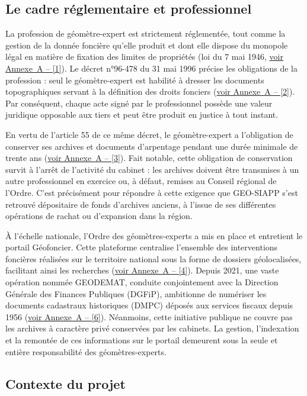 \subsection{Le cadre réglementaire et professionnel}

La profession de géomètre-expert est strictement réglementée, tout comme la gestion de la donnée foncière qu'elle produit et dont elle dispose du monopole légal en matière de fixation des limites de propriétés (loi du 7 mai 1946, \hyperref[ann:textes_loi]{voir Annexe~A -- [1]}). Le décret n°96-478 du 31 mai 1996 précise les obligations de la profession : seul le géomètre-expert est habilité à dresser les documents topographiques servant à la définition des droits fonciers (\hyperref[ann:textes_loi]{voir Annexe~A -- [2]}). Par conséquent, chaque acte signé par le professionnel possède une valeur juridique opposable aux tiers et peut être produit en justice à tout instant.

En vertu de l'article 55 de ce même décret, le géomètre-expert a l'obligation de conserver ses archives et documents d'arpentage pendant une durée minimale de trente ans (\hyperref[ann:textes_loi]{voir Annexe~A -- [3]}). Fait notable, cette obligation de conservation survit à l'arrêt de l'activité du cabinet : les archives doivent être transmises à un autre professionnel  en exercice ou, à défaut, remises au Conseil régional de l'Ordre. C'est précisément pour répondre à cette exigence que GEO-SIAPP s'est retrouvé dépositaire de fonds d'archives anciens, à l'issue de ses différentes opérations de rachat ou d'expansion dans la région.

À l'échelle nationale, l'Ordre des géomètres-experts a mis en place et entretient le portail Géofoncier. Cette plateforme centralise l'ensemble des interventions foncières réalisées sur le territoire national sous la forme de dossiers géolocalisées, facilitant ainsi les recherches (\hyperref[ann:textes_loi]{voir Annexe~A -- [4]}). Depuis 2021, une vaste opération nommée GEODEMAT, conduite conjointement avec la Direction Générale des Finances Publiques (DGFiP), ambitionne de numériser les documents cadastraux historiques (DMPC) déposés aux services fiscaux depuis 1956 (\hyperref[ann:textes_loi]{voir Annexe~A -- [6]}). Néanmoins, cette initiative publique ne couvre pas les archives à caractère privé conservées par les cabinets. La gestion, l'indexation et la remontée de ces informations  sur le portail demeurent sous la seule et entière responsabilité des géomètres-experts.

\subsection{Contexte du projet}

